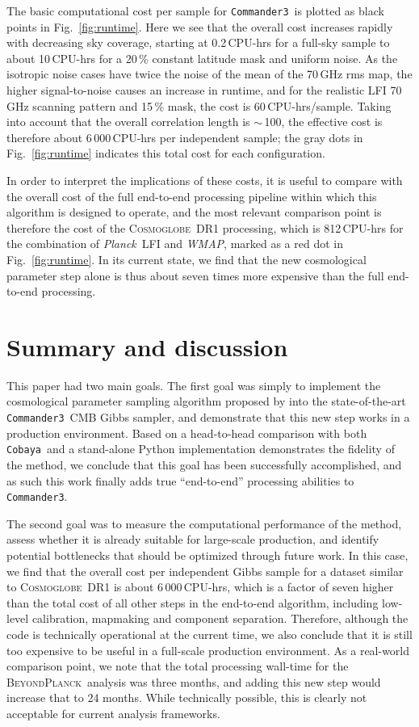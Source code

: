 \documentclass[twocolumn]{../common/aa}
\def\WMAP{\emph{WMAP}}
\def\Planck{\emph{Planck}}
\def\commanderthree{\texttt{Commander3}}
\def\cobaya{\texttt{Cobaya}}
\newcommand{\BP}{\textsc{BeyondPlanck}}
\newcommand{\cosmoglobe}{\textsc{Cosmoglobe}}
\begin{document}
The basic computational cost per sample for \commanderthree\ is plotted as black points in Fig.~\ref{fig:runtime}. Here we see that the overall cost increases rapidly with decreasing sky coverage, starting at 0.2\,CPU-hrs for a full-sky sample to about 10\,CPU-hrs for a 20\,\% constant latitude mask and uniform noise. As the isotropic noise cases have twice the noise of the mean of the 70\,GHz rms map, the higher signal-to-noise causes an increase in runtime, and for the realistic LFI 70\,GHz scanning pattern and 15\,\% mask, the cost is 60\,CPU-hrs/sample. Taking into account that the overall correlation length is $\sim$\,100, the effective cost is therefore about 6\,000\,CPU-hrs per independent sample; the gray dots in Fig.~\ref{fig:runtime} indicates this total cost for each configuration.

In order to interpret the implications of these costs, it is useful to compare with the overall cost of the full end-to-end processing pipeline within which this algorithm is designed to operate, and the most relevant comparison point is therefore the cost of the \cosmoglobe\ DR1 processing, which is 812\,CPU-hrs for the combination of \Planck\ LFI and \WMAP, marked as a red dot in Fig.~\ref{fig:runtime}. In its current state, we find that the new cosmological parameter step alone is thus about seven times more expensive than the full end-to-end processing. 

\section{Summary and discussion}
\label{sec:conclusions}

This paper had two main goals. The first goal was simply to implement the cosmological parameter sampling algorithm proposed by \citet{racine:2016} into the state-of-the-art \commanderthree\ CMB Gibbs sampler, and demonstrate that this new step works in a production environment. Based on a head-to-head comparison with both \cobaya\ and a stand-alone Python implementation demonstrates the fidelity of the method, we conclude that this goal has been successfully accomplished, and as such this work finally adds true ``end-to-end'' processing abilities to \commanderthree. 

The second goal was to measure the computational performance of the method, assess whether it is already suitable for large-scale production, and identify potential bottlenecks that should be optimized through future work. In this case, we find that the overall cost per independent Gibbs sample for a dataset similar to \cosmoglobe\ DR1 is about 6\,000\,CPU-hrs, which is a factor of seven higher than the total cost of all other steps in the end-to-end algorithm, including low-level calibration, mapmaking and component separation. Therefore, although the code is technically operational at the current time, we also conclude that it is still too expensive to be useful in a full-scale production environment. As a real-world comparison point, we note that the total processing wall-time for the \BP\ analysis was three months, and adding this new step would increase that to 24 months. While technically possible, this is clearly not acceptable for current analysis frameworks.
\end{document}
